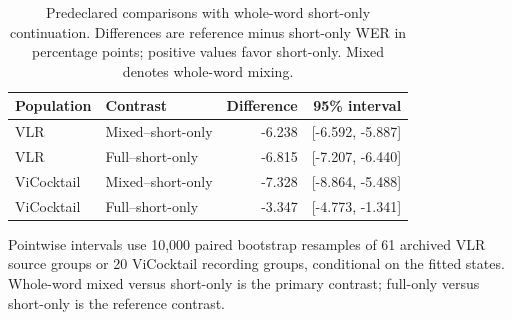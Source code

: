 \begin{table}[tbp]
\centering\small
\caption{Predeclared comparisons with whole-word short-only continuation.
Differences are reference minus short-only WER in percentage points;
positive values favor short-only. Mixed denotes whole-word mixing.}
\label{tab:shortonly}
\begin{tabular}{llrr}
\toprule
Population & Contrast & Difference & 95\% interval\\
\midrule
VLR & Mixed--short-only & -6.238 & [-6.592, -5.887]\\
VLR & Full--short-only & -6.815 & [-7.207, -6.440]\\
ViCocktail & Mixed--short-only & -7.328 & [-8.864, -5.488]\\
ViCocktail & Full--short-only & -3.347 & [-4.773, -1.341]\\
\bottomrule
\end{tabular}
\par\smallskip\begin{minipage}{\linewidth}\footnotesize
Pointwise intervals use 10,000 paired bootstrap resamples of 61 archived
VLR source groups or 20 ViCocktail recording groups, conditional on the fitted
states. Whole-word mixed versus short-only is the primary contrast;
full-only versus short-only is the reference contrast.
\end{minipage}
\end{table}
